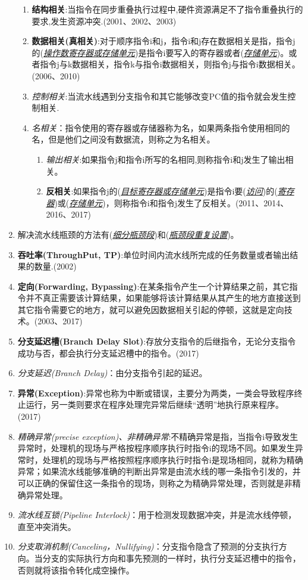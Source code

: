 \documentclass[a4paper]{ctexbook}
\newcommand{\blank}[1]{(\emph{\underline{#1}})}
\begin{document}
\begin{enumerate}
  \begin{enumerate}
    \item \textbf{结构相关}:当指令在同步重叠执行过程中,硬件资源满足不了指令重叠执行的要求,发生资源冲突.(2001、2002、2003)
    \item \textbf{数据相关(真相关)}:对于顺序指令i和j，指令i和j存在数据相关是指，指令j的\blank{操作数寄存器或存储单元}是指令i要写入的寄存器或者\blank{存储单元}。或者指令j与k数据相关，指令k与指令i数据相关，则指令j与指令i数据相关。(2006、2010)
    \item \emph{控制相关}:当流水线遇到分支指令和其它能够改变PC值的指令就会发生控制相关.
    \item \emph{名相关}：指令使用的寄存器或存储器称为名，如果两条指令使用相同的名，但是他们之间没有数据流，则称之为名相关。
    \begin{enumerate}
      \item \emph{输出相关}:如果指令j和指令i所写的名相同,则称指令i和j发生了输出相关。
      \item \textbf{反相关}:如果指令j的\blank{目标寄存器或存储单元}是指令i要\blank{访问}的\blank{寄存器}或\blank{存储单元}，则称指令i和指令j发生了反相关。(2011、2014、2016、2017)
    \end{enumerate}
  \end{enumerate}
  \item 解决流水线瓶颈的方法有\blank{细分瓶颈段}和\blank{瓶颈段重复设置}。
  \item \textbf{吞吐率(ThroughPut, TP)}:单位时间内流水线所完成的任务数量或者输出结果的数量.(2002)
  \item \textbf{定向(Forwarding, Bypassing)}:在某条指令产生一个计算结果之前，其它指令并不真正需要该计算结果，如果能够将该计算结果从其产生的地方直接送到其它指令需要它的地方，就可以避免因数据相关引起的停顿，这就是定向技术。(2003、2017)
  \item \textbf{分支延迟槽(Branch Delay Slot)}:存放分支指令的后继指令，无论分支指令成功与否，都会执行分支延迟槽中的指令。(2017)
  \item \emph{分支延迟(Branch Delay)}：由分支指令引起的延迟。
  \item \textbf{异常(Exception)}:异常也称为中断或错误，主要分为两类，一类会导致程序终止运行，另一类则要求在程序处理完异常后继续“透明”地执行原来程序。(2017)
  \item \emph{精确异常(precise exception)、非精确异常}:不精确异常是指，当指令i导致发生异常时，处理机的现场与严格按程序顺序执行时指令i的现场不同。如果发生异常时，处理机的现场与严格按照程序顺序执行时指令i是现场相同，就称为精确异常；如果流水线能够准确的判断出异常是由流水线的哪一条指令引发的，并可以正确的保留住这一条指令的现场，则称之为精确异常处理，否则就是非精确异常处理。
  \item \emph{流水线互锁(Pipeline Interlock)}：用于检测发现数据冲突，并是流水线停顿，直至冲突消失。
  \item \emph{分支取消机制(Canceling，Nullifying)}：分支指令隐含了预测的分支执行方向。当分支的实际执行方向和事先预测的一样时，执行分支延迟槽中的指令，否则就将该指令转化成空操作。
\end{enumerate}
\end{document}
